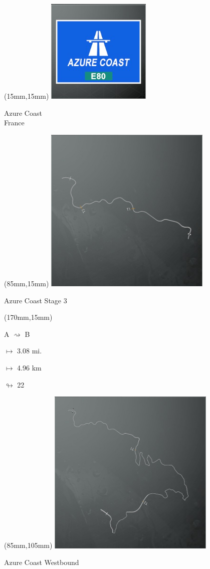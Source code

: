 \begin{textblock*}{60mm}(15mm,15mm)%
\includegraphics[width=50mm]{LG/2015-05-20_00073.png}
\par Azure Coast\\ France
\end{textblock*}
\begin{textblock*}{80mm}(85mm,15mm)%
\includegraphics[width=80mm]{TR/2015-05-20_00005.png}
\centerline{Azure Coast Stage 3}
\end{textblock*}
\begin{textblock*}{30mm}(170mm,15mm)%
\par A $\rightsquigarrow$ B
\Large
\par$\mapsto$ 3.08 mi.
\par$\mapsto$ 4.96 km
\par$\looparrowright$ 22
\end{textblock*}
\begin{textblock*}{80mm}(85mm,105mm)%
\includegraphics[width=80mm]{TR/2015-05-20_00006.png}
\centerline{Azure Coast Westbound}
\end{textblock*}
